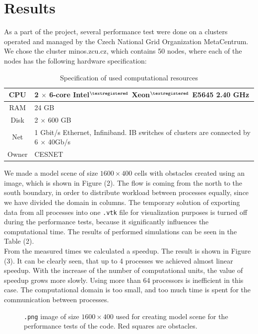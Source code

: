 \documentclass[a4paper, 10pt]{article}
\begin{document}
\section{Results}
As a part of the project, several performance test were done on a clusters operated and managed by the Czech National Grid Organization MetaCentrum. We chose the cluster minos.zcu.cz, which contains 50 nodes, where each of the nodes has the following hardware specification:

\begingroup
\renewcommand*{\arraystretch}{1.5}
\begin{table}[h!]
	\centering
	\begin{tabular}{ | c | l | }
		\hline
		CPU & 2 $ \times $ 6-core Intel$ ^{{\scriptsize \textregistered}} $ Xeon$ ^{{\scriptsize \textregistered}} $ E5645 2.40 GHz \\ \hline
		RAM & 24 GB \\ \hline
		Disk & 2 $ \times $ 600 GB \\ \hline
		Net & 1 Gbit/s Ethernet, Infiniband. IB switches of clusters are connected by 6 $ \times $ 40Gb/s \\ \hline
		Owner & CESNET \\
		\hline
	\end{tabular}
	\caption{Specification of used computational resources}
	\label{2.3.16}
\end{table}
\endgroup

We made a model scene of size $ 1600 \times 400 $ cells with obstacles created using an image, which is shown in Figure (2). The flow is coming from the north to the south boundary, in order to distribute workload between processes equally, since we have divided the domain in columns. The temporary solution of exporting data from all processes into one \texttt{.vtk} file for visualization purposes is turned off during the performance tests, because it significantly influences the computational time. The results of performed simulations can be seen in the Table (2).\\

From the measured times we calculated a speedup. The result is shown in Figure (3). It can be clearly seen, that up to 4 processes we achieved almost linear speedup. With the increase of the number of computational units, the value of speedup grows more slowly. Using more than 64 processors is inefficient in this case. The computational domain is too small, and too much time is spent for the communication between processes.

\begin{figure}[h!]
	\centering
	\caption{\texttt{.png} image of size $ 1600 \times 400 $ used for creating model scene for the performance tests of the code. Red squares are obstacles.}
\end{figure}
\end{document}
